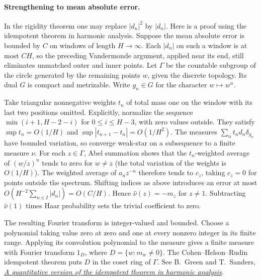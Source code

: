 \paragraph{Strengthening to mean absolute error.}
In the rigidity theorem one may replace $|d_n|^2$ by $|d_n|$.
Here is a proof using the idempotent theorem in harmonic analysis.
Suppose the mean absolute error is bounded by $C$ on windows of
length $H\to\infty$. Each $|d_n|$ on such a window is at most $CH$,
so the preceding Vandermonde argument, applied near its end, still
eliminates unmatched outer and inner points. Let $\Gamma$ be the
countable subgroup of the circle generated by the remaining points $w$,
given the discrete topology. Its dual $G$ is compact and metrizable.
Write $g_n\in G$ for the character $w\mapsto w^n$.

Take triangular nonnegative weights $t_n$ of total mass one on the
window with its last two positions omitted. Explicitly, normalize the
sequence $\min(i+1,H-2-i)$ for $0\le i\le H-3$, with zero values
outside. They satisfy $\sup t_n=O(1/H)$ and
$\sup|t_{n+1}-t_n|=O(1/H^2)$. The measures
$\sum_n t_nd_n\delta_{g_n}$ have bounded variation, so converge
weak-star on a subsequence to a finite measure $\nu$.
For each $z\in\Gamma$, Abel summation shows that the $t_n$-weighted
average of $(w/z)^n$ tends to zero for $w\ne z$ (the total variation
of the weights is $O(1/H)$). The weighted average of $a_nz^{-n}$
therefore tends to $c_z$, taking $c_z=0$ for points outside the
spectrum. Shifting indices as above introduces an error at most
$O(H^{-2}\sum_{n\in I}|d_n|)=O(C/H)$. Hence
$\widehat\nu(z)=-m_z$ for $z\ne1$. Subtracting
$\widehat\nu(1)$ times Haar probability sets the trivial coefficient
to zero.

The resulting Fourier transform is integer-valued and bounded.
Choose a polynomial taking value zero at zero and one at every
nonzero integer in its finite range. Applying its convolution
polynomial to the measure gives a finite measure with Fourier
transform $1_D$, where $D=\{w:m_w\ne0\}$. The
Cohen--Helson--Rudin idempotent theorem puts $D$ in the coset ring
of $\Gamma$. See B.~Green and T.~Sanders,
\href{https://doi.org/10.4007/annals.2008.168.1025}{\emph{A quantitative version of the
idempotent theorem in harmonic analysis}}.

